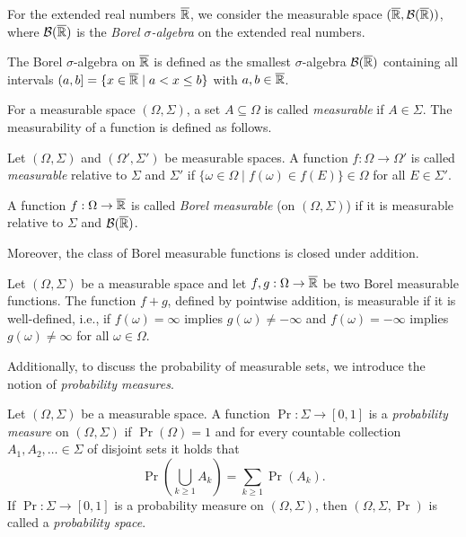 For the extended real numbers $\overline{\mathbb{R}}$, we consider the measurable space $(\overline{\mathbb{R}},\mathcal{B}(\overline{\mathbb{R}}))$, where $\mathcal{B}(\overline{\mathbb{R}})$ is the \textit{Borel $\sigma$-algebra} on the extended real numbers.

\begin{definition}
    The Borel $\sigma$-algebra on $\overline{\mathbb{R}}$ is defined as the smallest $\sigma$-algebra $\mathcal{B}(\overline{\mathbb{R}})$ containing all intervals $(a,b] = \{x \in \overline{\mathbb{R}} \mid a < x \leq b\}$ with $a,b \in \overline{\mathbb{R}}$. 
\end{definition}

For a measurable space $(\Omega, \Sigma)$, a set $A \subseteq \Omega$ is called \textit{measurable} if $A \in \Sigma$. The measurability of a function is defined as follows.

\begin{definition}
    Let $(\Omega,\Sigma)$ and $(\Omega',\Sigma')$ be measurable spaces. A function $f: \Omega \rightarrow \Omega'$ is called \textit{measurable} relative to $\Sigma$ and $\Sigma'$ if $\{\omega\in\Omega \mid f(\omega)\in f(E)\}\in \Omega$ for all $E \in \Sigma'$.

    A function $f: \Omega \rightarrow \overline{\mathbb{R}}$ is called \textit{Borel measurable} (on $(\Omega,\Sigma)$) if it is measurable relative to $\Sigma$ and $\mathcal{B}(\overline{\mathbb{R}})$.
\end{definition}

Moreover, the class of Borel measurable functions is closed under addition.

\begin{theorem}
    Let $(\Omega, \Sigma)$ be a measurable space and let $f,g: \Omega \rightarrow \overline{\mathbb{R}}$ be two Borel measurable functions. The function $f+g$, defined by pointwise addition, is measurable if it is well-defined, i.e., if $f(\omega) = \infty$ implies $g(\omega) \neq -\infty$ and $f(\omega) = -\infty$ implies $g(\omega) \neq \infty$ for all $\omega \in \Omega$.
\end{theorem}

Additionally, to discuss the probability of measurable sets, we introduce the notion of \textit{probability measures}.

\begin{definition}
    Let $(\Omega, \Sigma)$ be a measurable space. A function $\Pr : \Sigma \to [0,1]$ is a \textit{probability measure} on $(\Omega, \Sigma)$ if $\Pr(\Omega) = 1$ and for every countable collection $A_1, A_2, \ldots \in \Sigma$ of disjoint sets it holds that
    \[
        \Pr\left(\bigcup_{k \geq 1} A_k\right)
        = \sum_{k \geq 1} \Pr(A_k).
    \]
    If $\Pr : \Sigma \to [0,1]$ is a probability measure on $(\Omega, \Sigma)$, then $(\Omega, \Sigma, \Pr)$ is called a \textit{probability space}.
\end{definition}

